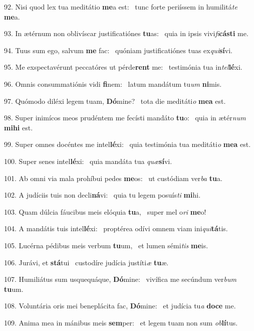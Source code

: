 92. Nisi quod lex tua meditátio \textbf{me}a est: \ast\  tunc forte periíssem in humilitá\textit{te} \textbf{me}a.\

93. In ætérnum non oblivíscar justificatiónes \textbf{tu}as: \ast\  quia in ipsis vivi\textit{fi}\textbf{cás}\textbf{ti} me.\

94. Tuus sum ego, salvum \textbf{me} fac: \ast\  quóniam justificatiónes tuas ex\textit{qui}\textbf{sí}vi.\

95. Me exspectavérunt peccatóres ut pérde\textbf{rent} me: \ast\  testimónia tua in\textit{tel}\textbf{lé}xi.\

96. Omnis consummatiónis vidi \textbf{fi}nem: \ast\  latum mandátum tu\textit{um} \textbf{ni}mis.\

97. Quómodo diléxi legem tuam, \textbf{Dó}mine? \ast\  tota die meditáti\textit{o} \textbf{me}\textbf{a} est.\

98. Super inimícos meos prudéntem me fecísti mandáto \textbf{tu}o: \ast\  quia in ætér\textit{num} \textbf{mi}\textbf{hi} est.\

99. Super omnes docéntes me intel\textbf{lé}xi: \ast\  quia testimónia tua meditáti\textit{o} \textbf{me}\textbf{a} est.\

100. Super senes intel\textbf{lé}xi: \ast\  quia mandáta tua \textit{quæ}\textbf{sí}vi.\

101. Ab omni via mala prohíbui pedes \textbf{me}os: \ast\  ut custódiam ver\textit{ba} \textbf{tu}a.\

102. A judíciis tuis non decli\textbf{ná}vi: \ast\  quia tu legem posuís\textit{ti} \textbf{mi}hi.\

103. Quam dúlcia fáucibus meis elóquia \textbf{tu}a, \ast\  super mel o\textit{ri} \textbf{me}o!\

104. A mandátis tuis intel\textbf{lé}xi: \ast\  proptérea odívi omnem viam ini\textit{qui}\textbf{tá}tis.\

105. Lucérna pédibus meis verbum \textbf{tu}um, \ast\  et lumen sémi\textit{tis} \textbf{me}is.\

106. Jurávi, et \textbf{stá}tui \ast\  custodíre judícia justíti\textit{æ} \textbf{tu}æ.\

107. Humiliátus sum usquequáque, \textbf{Dó}mine: \ast\  vivífica me secúndum ver\textit{bum} \textbf{tu}um.\

108. Voluntária oris mei beneplácita fac, \textbf{Dó}mine: \ast\  et judícia tu\textit{a} \textbf{do}\textbf{ce} me.\

109. Anima mea in mánibus meis \textbf{sem}per: \ast\  et legem tuam non sum \textit{ob}\textbf{lí}tus.\

